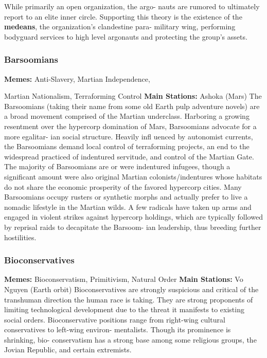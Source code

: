 While primarily an open organization, the argo-
nauts are rumored to ultimately report to an elite 
inner circle. Supporting this theory is the existence 
of the \textbf{medeans}, the organization's clandestine para-
military wing, performing bodyguard services to high 
level argonauts and protecting the group's assets.

\subsubsection{Barsoomians}

\textbf{Memes:} Anti-Slavery, Martian Independence, 

Martian Nationalism, Terraforming Control
\textbf{Main Stations:} Ashoka (Mars)
The Barsoomians (taking their name from some old 
Earth pulp adventure novels) are a broad movement 
comprised of the Martian underclass. Harboring a 
growing resentment over the hypercorp domination 
of Mars, Barsoomians advocate for a more egalitar-
ian social structure. Heavily infl uenced by autonomist 
currents, the Barsoomians demand local control 
of terraforming projects, an end to the widespread 
practiced of indentured servitude, and control of the 
Martian Gate. The majority of Barsoomians are or 
were indentured infugees, though a significant amount 
were also original Martian colonists/indentures whose 
habitats do not share the economic prosperity of the 
favored hypercorp cities. Many Barsoomians occupy 
rusters or synthetic morphs and actually prefer to 
live a nomadic lifestyle in the Martian wilds. A few 
radicals have taken up arms and engaged in violent 
strikes against hypercorp holdings, which are typically 
followed by reprisal raids to decapitate the Barsoom-
ian leadership, thus breeding further hostilities.

\subsubsection{Bioconservatives}

\textbf{Memes:} Bioconservatism, Primitivism, Natural Order
\textbf{Main Stations:} Vo Nguyen (Earth orbit)
Bioconservatives are strongly suspicious and critical 
of the transhuman direction the human race is taking. 
They are strong proponents of limiting technological 
development due to the threat it manifests to existing 
social orders. Bioconservative positions range from 
right-wing cultural conservatives to left-wing environ-
mentalists. Though its prominence is shrinking, bio-
conservatism has a strong base among some religious 
groups, the Jovian Republic, and certain extremists.


